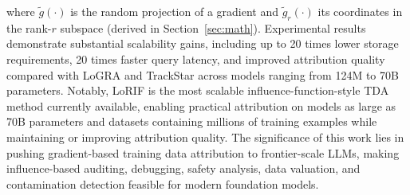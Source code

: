 \documentclass{article}
\newcommand{\gt}[1]{\tilde{g}(#1)}              %
\newcommand{\gtr}[1]{\tilde{g}_r(#1)}           %
\begin{document}
where $\gt{\cdot}$ is the random projection of a gradient and $\gtr{\cdot}$ its coordinates in the rank-$r$ subspace (derived in Section~\ref{sec:math}). Experimental results demonstrate substantial scalability gains, including up to 20 times lower storage requirements, 20 times faster query latency, and improved attribution quality compared with LoGRA and TrackStar across models ranging from 124M to 70B parameters. Notably, LoRIF is the most scalable influence-function-style TDA method currently available, enabling practical attribution on models as large as 70B parameters and datasets containing millions of training examples while maintaining or improving attribution quality. The significance of this work lies in pushing gradient-based training data attribution to frontier-scale LLMs, making influence-based auditing, debugging, safety analysis, data valuation, and contamination detection feasible for modern foundation models.



\printbibliography
\end{document}
